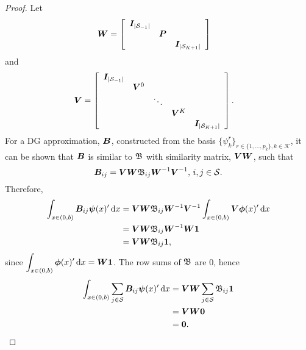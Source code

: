 \begin{proof}
Let 
\begin{align*}
	\boldsymbol W &= \left[\begin{array}{ccc}
		\boldsymbol I_{|\mathcal{S}_{-1}|} & & \\
		& \boldsymbol P &  \\
		& & \boldsymbol I_{|\mathcal{S}_{K+1}|}
	\end{array}\right]
\end{align*}{ and }
\begin{align*}
  \boldsymbol V &= \left[\begin{array}{ccccc}
		\boldsymbol I_{|\mathcal{S}_{-1}|} & & & &  \\
		& \boldsymbol V^0 & & &  \\
		& & \ddots & & \\
		& & & \boldsymbol V^K \\
		& & & & \boldsymbol I_{|\mathcal{S}_{K+1}|}
	\end{array}\right]. 
\end{align*}
For a DG approximation, \(\boldsymbol B\), constructed from the basis \(\{\psi^r_k\}_{r\in\{1,...,p_k\},k\in\mathcal K}\), it can be shown that \(\boldsymbol B\) is similar to \( {  {\mathfrak{\boldsymbol B}}}\) with similarity matrix, \(\boldsymbol V\boldsymbol W\), such that 
\[  \boldsymbol B_{ij} =  \boldsymbol V\boldsymbol W{ \mathfrak{\boldsymbol B}}_{ij}\boldsymbol W^{-1}\boldsymbol V^{-1},\,i,j\in\mathcal{S}.\]
Therefore, 
\begin{align*} 
	\int_{x\in(0,b)}  \boldsymbol B_{ij}\boldsymbol\psi(x)'{} \, \mathrm{d} x &= \boldsymbol V\boldsymbol W { \mathfrak{\boldsymbol B}}_{ij}\boldsymbol W^{-1}\boldsymbol V^{-1}\int_{x\in(0,b)} \boldsymbol V\boldsymbol \phi(x)'{}\, \mathrm{d} x 
	\\&=\boldsymbol V\boldsymbol W { \mathfrak{\boldsymbol B}}_{ij}\boldsymbol W^{-1} \boldsymbol W\boldsymbol 1 \\&= \boldsymbol V \boldsymbol W { \mathfrak{\boldsymbol B}}_{ij}\boldsymbol 1,
\end{align*}
since \(\displaystyle\int_{x\in(0,b)} \boldsymbol \phi(x)'{}\, \mathrm{d} x =\boldsymbol W\boldsymbol 1\).
The row sums of \(\mathfrak{\boldsymbol B}\) are 0, hence 
\begin{align}\label{eqn:Bsums0} 
	\int_{x\in(0,b)}  \sum_{j\in\mathcal{S}}\boldsymbol B_{ij}\boldsymbol\psi(x)'{} \, \mathrm{d} x  &=  \boldsymbol V\boldsymbol W \sum_{j\in\mathcal{S}}{ \mathfrak{\boldsymbol B}}_{ij}\boldsymbol 1 \\&=  \boldsymbol V\boldsymbol W \boldsymbol 0 \\&= \boldsymbol 0.
\end{align}


\end{proof}

